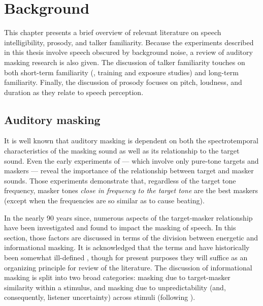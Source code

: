 \chapter{Background}
This chapter presents a brief overview of relevant literature on speech intelligibility, prosody, and talker familiarity.  Because the experiments described in this thesis involve speech obscured by background noise, a review of auditory masking research is also given.  The discussion of talker familiarity touches on both short-term familiarity (\ie, training and exposure studies) and long-term familiarity.  Finally, the discussion of prosody focuses on pitch, loudness, and duration as they relate to speech perception.

\section{Auditory masking}
It is well known that auditory masking is dependent on both the spectrotemporal characteristics of the masking sound as well as its relationship to the target sound.  %
Even the early experiments of \citet{WegelLane1924} — which involve only pure-tone targets and maskers — reveal the importance of the relationship between target and masker sounds.  Those experiments demonstrate that, regardless of the target tone frequency, masker tones \emph{close in frequency to the target tone} are the best maskers (except when the frequencies are so similar as to cause beating).  

In the nearly 90 years since, numerous aspects of the target-masker relationship have been investigated and found to impact the masking of speech.  In this section, those factors are discussed in terms of the division between energetic and informational masking.  It is acknowledged that the terms  and  have historically been somewhat ill-defined \citep[cf. discussions in][]{DurlachEtAl2003a, Watson2005}, though for present purposes they will suffice as an organizing principle for review of the literature.  The discussion of informational masking is split into two broad categories: masking due to target-masker similarity within a stimulus, and masking due to unpredictability (and, consequently, listener uncertainty) across stimuli (following \citealt{KiddEtAl2002} \etseq).  

